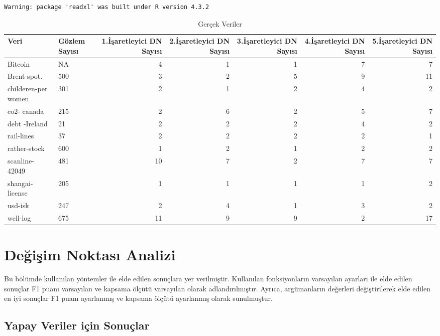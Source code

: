 \documentclass[12pt,twoside]{deuthesis}
\begin{document}
\begin{verbatim}
Warning: package 'readxl' was built under R version 4.3.2
\end{verbatim}

\begin{table}[!h]

\caption{\label{tab:ngercek}Gerçek Veriler}
\centering
\fontsize{6}{8}\selectfont
\begin{tabular}[t]{llrrrrr}
\toprule
Veri & Gözlem Sayısı & 1.İşaretleyici DN Sayısı & 2.İşaretleyici DN Sayısı & 3.İşaretleyici DN Sayısı & 4.İşaretleyici DN Sayısı & 5.İşaretleyici DN Sayısı\\
\midrule
Bitcoin & NA & 4 & 1 & 1 & 7 & 7\\
Brent-spot. & 500 & 3 & 2 & 5 & 9 & 11\\
childeren-per women & 301 & 2 & 1 & 2 & 4 & 2\\
co2- canada & 215 & 2 & 6 & 2 & 5 & 7\\
debt -Ireland & 21 & 2 & 2 & 2 & 4 & 2\\
\addlinespace
rail-lines & 37 & 2 & 2 & 2 & 2 & 1\\
rather-stock & 600 & 1 & 2 & 1 & 2 & 2\\
scanline-42049 & 481 & 10 & 7 & 2 & 7 & 7\\
shangai-license & 205 & 1 & 1 & 1 & 1 & 2\\
usd-isk & 247 & 2 & 4 & 1 & 3 & 2\\
\addlinespace
well-log & 675 & 11 & 9 & 9 & 2 & 17\\
\bottomrule
\end{tabular}
\end{table}

\section{Değişim Noktası Analizi}\label{deux11fiux15fim-noktasux131-analizi}

Bu bölümde kullanılan yöntemler ile elde edilen sonuçlara yer verilmiştir. Kullanılan fonksiyonların varsayılan ayarları ile elde edilen sonuçlar F1 puanı varsayılan ve kapsama ölçütü varsayılan olarak adlandırılmıştır. Ayrıca, argümanların değerleri değiştirilerek elde edilen en iyi sonuçlar F1 puanı ayarlanmış ve kapsama ölçütü ayarlanmış olarak sunulmuştur.

\subsection{Yapay Veriler için Sonuçlar}\label{yapay-veriler-iuxe7in-sonuuxe7lar}
\end{document}
